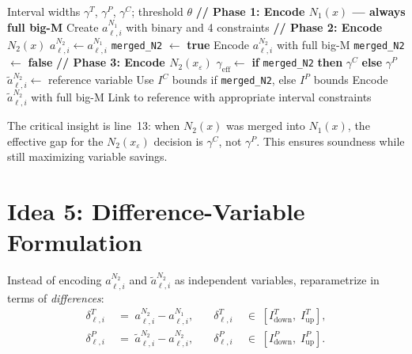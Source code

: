 \documentclass[11pt]{article}
\newcommand{\layerl}{\ell}
\begin{document}
\begin{algorithm}[H]
\caption{Corrected hybrid variable management for neuron $(\ell, i)$}
\label{alg:corrected_hybrid}
\begin{algorithmic}[1]
\Require Interval widths $\gamma^T$, $\gamma^P$, $\gamma^C$;
         threshold $\theta$
\State \textbf{// Phase 1: Encode $N_1(x)$ --- always full big-M}
\State Create $a^{N_1}_{\ell,i}$ with binary and 4 constraints
\Statex
\State \textbf{// Phase 2: Encode $N_2(x)$}
    \State $a^{N_2}_{\ell,i} \gets a^{N_1}_{\ell,i}$
    \State \texttt{merged\_N2} $\gets$ \textbf{true}
\Else
    \State Encode $a^{N_2}_{\ell,i}$ with full big-M
    \State \texttt{merged\_N2} $\gets$ \textbf{false}
\EndIf
\Statex
\State \textbf{// Phase 3: Encode $N_2(x_\varepsilon)$}
\State $\gamma_{\text{eff}} \gets$ \textbf{if} \texttt{merged\_N2} \textbf{then} $\gamma^C$ \textbf{else} $\gamma^P$
    \State $\tilde{a}^{N_2}_{\ell,i} \gets$ reference variable
    \State Use $I^C$ bounds if \texttt{merged\_N2}, else $I^P$ bounds
\Else
    \State Encode $\tilde{a}^{N_2}_{\ell,i}$ with full big-M
    \State Link to reference with appropriate interval constraints
\EndIf
\end{algorithmic}
\end{algorithm}

The critical insight is line~13: when $N_2(x)$ was merged into $N_1(x)$,
the effective gap for the $N_2(x_\varepsilon)$ decision is $\gamma^C$,
not $\gamma^P$. This ensures soundness while still maximizing variable
savings.


\section{Idea 5: Difference-Variable Formulation}
\label{sec:diffvar}

Instead of encoding $a^{N_2}_{\layerl,i}$ and $\tilde{a}^{N_2}_{\layerl,i}$ as
independent variables, reparametrize in terms of \emph{differences}:
\begin{align}
    \delta^T_{\layerl,i} &\;=\; a^{N_2}_{\layerl,i} - a^{N_1}_{\layerl,i},
    &\quad \delta^T_{\layerl,i} &\;\in\; [I^T_{\text{down}},\; I^T_{\text{up}}], \\
    \delta^P_{\layerl,i} &\;=\; \tilde{a}^{N_2}_{\layerl,i} - a^{N_2}_{\layerl,i},
    &\quad \delta^P_{\layerl,i} &\;\in\; [I^P_{\text{down}},\; I^P_{\text{up}}].
\end{align}
\end{document}

